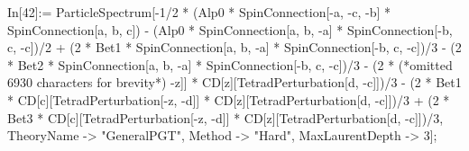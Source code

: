 In[42]:= ParticleSpectrum[-1/2 * (Alp0 * SpinConnection[-a, -c, -b] * SpinConnection[a, b, c]) - (Alp0 * SpinConnection[a, b, -a] * SpinConnection[-b, c, -c])/2 + (2 * Bet1 * SpinConnection[a, b, -a] * SpinConnection[-b, c, -c])/3 - (2 * Bet2 * SpinConnection[a, b, -a] * SpinConnection[-b, c, -c])/3 - (2 * (*omitted 6930 characters for brevity*) -z]] * CD[z][TetradPerturbation[d, -c]])/3 - (2 * Bet1 * CD[c][TetradPerturbation[-z, -d]] * CD[z][TetradPerturbation[d, -c]])/3 + (2 * Bet3 * CD[c][TetradPerturbation[-z, -d]] * CD[z][TetradPerturbation[d, -c]])/3, TheoryName -> "GeneralPGT", Method -> "Hard", MaxLaurentDepth -> 3];